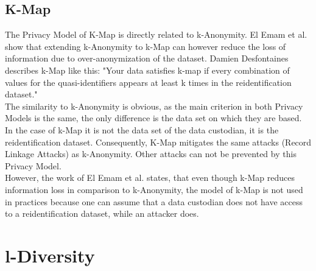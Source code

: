 \documentclass[12pt, a4paper,oneside]{report}
\begin{document}
\subsection{K-Map}
The Privacy Model of K-Map is directly related to k-Anonymity. El Emam et al. show that extending k-Anonymity to k-Map can however reduce the loss of information due to over-anonymization of the dataset\cite{Emam2008}. Damien Desfontaines describes k-Map like this: "Your data satisfies k-map if every combination of values for the quasi-identifiers appears at least k times in the reidentification dataset."\cite{desfontaines}\\
The similarity to k-Anonymity is obvious, as the main criterion in both Privacy Models is the same, the only difference is the data set on which they are based. In the case of k-Map it is not the data set of the data custodian, it is the reidentification dataset\cite{desfontaines}. Consequently, K-Map mitigates the same attacks (Record Linkage Attacks) as k-Anonymity. Other attacks can not be prevented by this Privacy Model.\\
However, the work of El Emam et al. states, that even though k-Map reduces information loss in comparison to k-Anonymity, the model of k-Map is not used in practices because one can assume that a data custodian does not have access to a reidentification dataset, while an attacker does\cite{Emam2008}.  

\section{l-Diversity}
\end{document}
